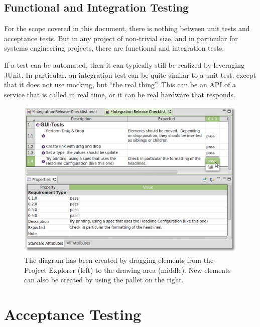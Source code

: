 \subsection{Functional and Integration Testing}

For the scope covered in this document, there is nothing between unit tests and acceptance tests.  But in any project of non-trivial size, and in particular for systems engineering projects, there are functional and integration tests.

If a test can be automated, then it can typically still be realized by leveraging JUnit.  In particular, an integration test can be quite similar to a unit test, except that it does not use mocking, but ``the real thing''.  This can be an API of a service that is called in real time, or it can be real hardware that responds.

\begin{figure}[h!]
  \centering
  \includegraphics[width=\linewidth]{../se-images/manual-testing-1.png}
  \caption{The diagram has been created by dragging elements from the Project Explorer (left) to the drawing area (middle).  New elements can also be created by using the pallet on the right.}
  \label{fig:manual-testing}
\end{figure}

\section{Acceptance Testing}

